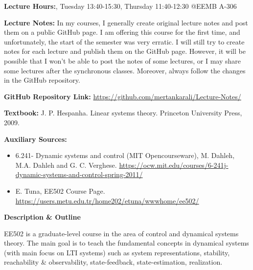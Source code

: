 \documentclass[11pt,oneside]{amsart}
\newcommand{\header}[1]{\bigbreak\textbf{#1}}
\begin{document}
\vspace{9pt}

\textbf{Lecture Hours:}, Tuesday 13:40-15:30, Thursday 11:40-12:30
@EEMB A-306

\vspace{9pt}

\textbf{Lecture Notes:} In my courses, I generally create original
lecture notes and post them on a public GitHub page. I am offering
this course for the first time, and unfortunately, the start of the
semester was very erratic. I will still try to create notes for each
lecture and publish them on the GitHub page. However, it will be
possible that I won't be able to post the notes of some lectures, or
I may share some lectures after the synchronous classes. Moreover, always follow the changes in the GitHub repository. 

\vspace{6pt}

\textbf{GitHub Repository Link:} \url{https://github.com/mertankarali/Lecture-Notes/}

\vspace{6pt}

\textbf{Textbook:} J. P. Hespanha. Linear systems theory. Princeton
University Press, 2009.

\vspace{6pt}

\textbf{Auxiliary Sources:}

\begin{itemize}
  \item 6.241- Dynamic systems and control (MIT Opencourseware),
    M. Dahleh, M.A. Dahleh and G. C. Verghese. \url{https://ocw.mit.edu/courses/6-241j-dynamic-systems-and-control-spring-2011/}
   \item E. Tuna, EE502 Course Page. \url{https://users.metu.edu.tr/home202/etuna/wwwhome/ee502/}
\end{itemize}

\newpage

\header{Description \& Outline}

\vspace{6pt}

EE502 is a graduate-level course in the area of control and dynamical
systems theory. 
The main goal is to teach the fundamental concepts in dynamical systems (with
main focus on LTI systems) such as system representations, stability,
reachability \& observability, state-feedback, state-estimation,
realization. 

\vspace{6pt}
\end{document}
